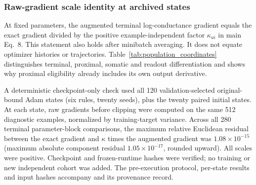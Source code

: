 \subsubsection*{Raw-gradient scale identity at archived states}
\label{sec:gradient_scale_identity}
At fixed parameters, the augmented terminal log-conductance gradient equals the exact gradient divided by the positive example-independent factor $\kappa_{ui}$ in main Eq.~8. This statement also holds after minibatch averaging. It does not equate optimizer histories or trajectories. Table~\ref{tab:population_coordinates} distinguishes terminal, proximal, somatic and readout differentiation and shows why proximal eligibility already includes its own output derivative.

A deterministic checkpoint-only check used all 120 validation-selected original-bound Adam states (six rules, twenty seeds), plus the twenty paired initial states. At each state, raw gradients before clipping were computed on the same 512 diagnostic examples, normalized by training-target variance. Across all 280 terminal parameter-block comparisons, the maximum relative Euclidean residual between the exact gradient and $\kappa$ times the augmented gradient was $1.08\times10^{-15}$ (maximum absolute component residual $1.05\times10^{-17}$, rounded upward). All scales were positive. Checkpoint and frozen-runtime hashes were verified; no training or new independent cohort was added. The pre-execution protocol, per-state results and input hashes accompany  and its provenance record.
